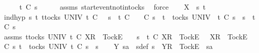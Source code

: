 \ \ \isamarkupfalse%
\ \isamarkupfalse%
\ {\isachardoublequoteopen}t\ {\isasymle}\isactrlsub C\ s{}{\isacharprime}{\isachardoublequoteclose}\isanewline
\ \ \ \ \isamarkupfalse%
\ assms{\isacharparenleft}{}{\isacharparenright}\ start{\isacharunderscore}event{\isacharunderscore}notin{\isacharunderscore}tocks\ \isamarkupfalse%
\ force\isanewline
{}\isamarkupfalse%
\isanewline
\ \ \isamarkupfalse%
\ X\ {\isasymsigma}\ s{}{\isacharprime}\ t\isanewline
\ \ \isamarkupfalse%
\ ind{\isacharunderscore}hyp{\isacharcolon}\ {\isachardoublequoteopen}{\isasymAnd}s{}{\isacharprime}\ t{\isachardot}\ {\isasymforall}t{\isasymin}tocks\ UNIV{\isachardot}\ t\ {\isasymle}\isactrlsub C\ {\isasymsigma}\ {\isacharat}\ s{}\ {\isasymlongrightarrow}\ t\ {\isasymle}\isactrlsub C\ {\isasymsigma}\ {\isasymLongrightarrow}\ {\isasymsigma}\ {\isasymsubseteq}\isactrlsub C\ s{}{\isacharprime}\ {\isasymLongrightarrow}\ t\ {\isasymin}\ tocks\ UNIV\ {\isasymLongrightarrow}\ t\ {\isasymle}\isactrlsub C\ s{}{\isacharprime}\ {\isacharat}\ s{}\ {\isasymLongrightarrow}\ t\ {\isasymle}\isactrlsub C\ s{}{\isacharprime}{\isachardoublequoteclose}\isanewline
\ \ \isamarkupfalse%
\ assms{\isacharcolon}\ {\isachardoublequoteopen}{\isasymforall}t{\isasymin}tocks\ UNIV{\isachardot}\ t\ {\isasymle}\isactrlsub C\ {\isacharparenleft}{\isacharbrackleft}X{\isacharbrackright}\isactrlsub R\ {\isacharhash}\ {\isacharbrackleft}Tock{\isacharbrackright}\isactrlsub E\ {\isacharhash}\ {\isasymsigma}{\isacharparenright}\ {\isacharat}\ s{}\ {\isasymlongrightarrow}\ t\ {\isasymle}\isactrlsub C\ {\isacharbrackleft}X{\isacharbrackright}\isactrlsub R\ {\isacharhash}\ {\isacharbrackleft}Tock{\isacharbrackright}\isactrlsub E\ {\isacharhash}\ {\isasymsigma}{\isachardoublequoteclose}\ {\isachardoublequoteopen}{\isacharbrackleft}X{\isacharbrackright}\isactrlsub R\ {\isacharhash}\ {\isacharbrackleft}Tock{\isacharbrackright}\isactrlsub E\ {\isacharhash}\ {\isasymsigma}\ {\isasymsubseteq}\isactrlsub C\ s{}{\isacharprime}{\isachardoublequoteclose}\ {\isachardoublequoteopen}t\ {\isasymin}\ tocks\ UNIV{\isachardoublequoteclose}\ {\isachardoublequoteopen}t\ {\isasymle}\isactrlsub C\ s{}{\isacharprime}\ {\isacharat}\ s{}{\isachardoublequoteclose}\isanewline
\ \ \isamarkupfalse%
\ Y\ s{}{\isacharprime}a\ \ s{}{\isacharprime}{\isacharunderscore}def{\isacharcolon}\ {\isachardoublequoteopen}s{}{\isacharprime}\ {\isacharequal}\ {\isacharbrackleft}Y{\isacharbrackright}\isactrlsub R\ {\isacharhash}\ {\isacharbrackleft}Tock{\isacharbrackright}\isactrlsub E\ {\isacharhash}\ s{}{\isacharprime}a{\isachardoublequoteclose}\isanewline
